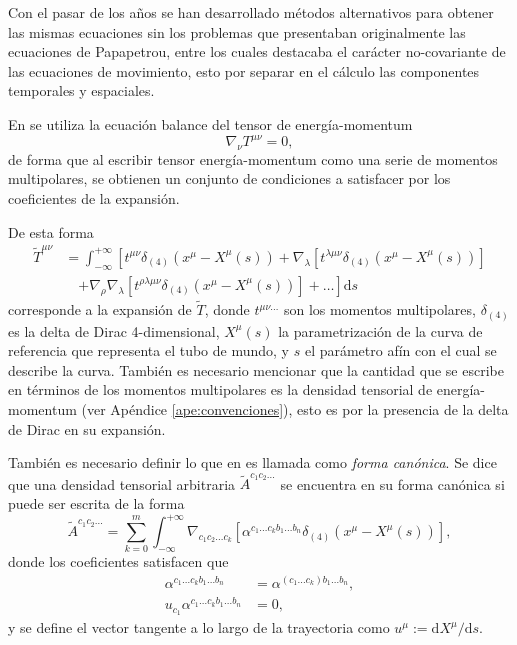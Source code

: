 Con el pasar de los años se han desarrollado métodos alternativos para obtener las mismas ecuaciones sin los problemas que presentaban originalmente las ecuaciones de Papapetrou, entre los cuales destacaba el carácter no-covariante de las ecuaciones de movimiento, esto por separar en el cálculo las componentes temporales y espaciales.

En \cite{Steinhoff-Puetzfeld} se utiliza la ecuación balance del tensor de energía-momentum
\begin{equation}
\label{eq:22}
\nabla_{\nu} T^{\mu \nu} = 0,
\end{equation}
de forma que al escribir tensor energía-momentum como una serie de momentos multipolares, se obtienen un conjunto de condiciones a satisfacer por los coeficientes de la expansión. 

De esta forma
\begin{align}
\nonumber
\tilde{T}^{\mu \nu} &= \int^{+\infty}_{-\infty} \left[ t^{\mu \nu} \delta_{(4)}(x^{\mu} - X^{\mu}(s)) + \nabla_{\lambda} [t^{\lambda \mu \nu} \delta_{(4)}(x^{\mu} - X^{\mu}(s))] \right.\\
&\quad \left.  + \nabla_{\rho} \nabla_{\lambda} [t^{\rho \lambda \mu \nu} \delta_{(4)}(x^{\mu} - X^{\mu}(s))] +  \dots
\right] \mathrm{d}s
\end{align}
corresponde a la expansión de $\tilde{T}$, donde $t^{\mu \nu \dots}$ son los momentos multipolares, $\delta_{(4)}$ es la delta de Dirac 4-dimensional, $X^{\mu}(s)$ la parametrización de la curva de referencia que representa el tubo de mundo, y $s$ el parámetro afín con el cual se describe la curva. También es necesario mencionar que la cantidad que se escribe en términos de los momentos multipolares es la densidad tensorial de energía-momentum (ver Apéndice \ref{ape:convenciones}), esto es por la presencia de la delta de Dirac en su expansión.

También es necesario definir lo que en \cite{Tulczyjew} es llamada como \textit{forma canónica}. Se dice que una densidad tensorial arbitraria $\tilde{A}^{c_1 c_2 \dots}$ se encuentra en su forma canónica si puede ser escrita de la forma
\begin{equation}
\tilde{A}^{c_1 c_2 \dots} = \sum_{k=0}^{m} \int_{-\infty}^{+\infty} \nabla_{c_1 c_2 \dots c_k} \left[ \alpha^{c_1 \dots c_k b_1 \dots b_n} \delta_{(4)}(x^{\mu} - X^{\mu}(s)) \right], 
\end{equation}
donde los coeficientes satisfacen que
\begin{align}
\alpha^{c_1 \dots c_k b_1 \dots b_n} &= \alpha^{(c_1 \dots c_k) b_1 \dots b_n},\\
u_{c_1}\alpha^{c_1 \dots c_k b_1 \dots b_n} &= 0,
\end{align}
y se define el vector tangente a lo largo de la trayectoria como $u^{\mu} := \mathrm{d}X^{\mu} / \mathrm{d}s$.

